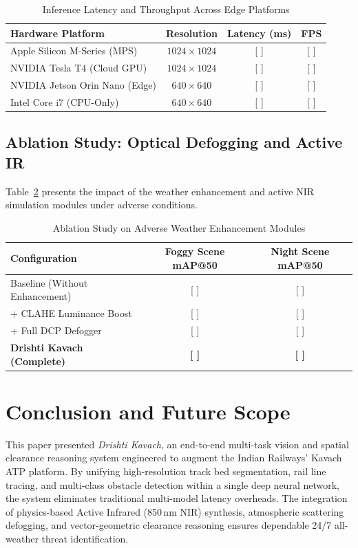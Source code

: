 \documentclass[conference]{IEEEtran}
\begin{document}
\begin{table}[h]
\centering
\caption{Inference Latency and Throughput Across Edge Platforms}
\label{tab:fps_results}
\begin{tabular}{l c c c}
\toprule
\textbf{Hardware Platform} & \textbf{Resolution} & \textbf{Latency (ms)} & \textbf{FPS} \\
\midrule
Apple Silicon M-Series (MPS) & $1024 \times 1024$ & [ ] & [ ] \\
NVIDIA Tesla T4 (Cloud GPU) & $1024 \times 1024$ & [ ] & [ ] \\
NVIDIA Jetson Orin Nano (Edge) & $640 \times 640$ & [ ] & [ ] \\
Intel Core i7 (CPU-Only) & $640 \times 640$ & [ ] & [ ] \\
\bottomrule
\end{tabular}
\end{table}

\subsection{Ablation Study: Optical Defogging and Active IR}
Table~\ref{tab:ablation} presents the impact of the weather enhancement and active NIR simulation modules under adverse conditions.

\begin{table}[h]
\centering
\caption{Ablation Study on Adverse Weather Enhancement Modules}
\label{tab:ablation}
\begin{tabular}{l c c}
\toprule
\textbf{Configuration} & \textbf{Foggy Scene mAP@50} & \textbf{Night Scene mAP@50} \\
\midrule
Baseline (Without Enhancement) & [ ] & [ ] \\
+ CLAHE Luminance Boost & [ ] & [ ] \\
+ Full DCP Defogger & [ ] & [ ] \\
\textbf{Drishti Kavach (Complete)} & \textbf{[ ]} & \textbf{[ ]} \\
\bottomrule
\end{tabular}
\end{table}

\section{Conclusion and Future Scope}
This paper presented \textit{Drishti Kavach}, an end-to-end multi-task vision and spatial clearance reasoning system engineered to augment the Indian Railways' Kavach ATP platform. By unifying high-resolution track bed segmentation, rail line tracing, and multi-class obstacle detection within a single deep neural network, the system eliminates traditional multi-model latency overheads. The integration of physics-based Active Infrared (850\,nm NIR) synthesis, atmospheric scattering defogging, and vector-geometric clearance reasoning ensures dependable 24/7 all-weather threat identification. 
\end{document}
